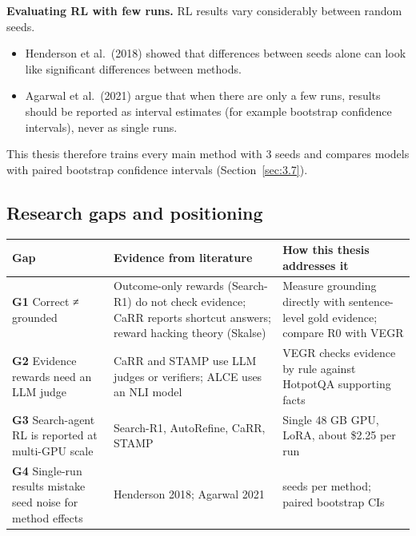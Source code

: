 \textbf{Evaluating RL with few runs.} RL results vary considerably
between random seeds.

\begin{itemize}
\tightlist
\item
  Henderson et al.~(2018) showed that differences between seeds alone
  can look like significant differences between methods.
\item
  Agarwal et al.~(2021) argue that when there are only a few runs,
  results should be reported as interval estimates (for example
  bootstrap confidence intervals), never as single runs.
\end{itemize}

This thesis therefore trains every main method with 3 seeds and compares
models with paired bootstrap confidence intervals
(Section~\ref{sec:3.7}).

\subsection{Research gaps and positioning}\label{sec:2.9}

{\def\LTcaptype{none} %
\begin{longtable}[]{@{}
  >{\raggedright\arraybackslash}p{}
  >{\raggedright\arraybackslash}p{}
  >{\raggedright\arraybackslash}p{}@{}}
\toprule\noalign{}
\begin{minipage}[b]{\linewidth}\raggedright
Gap
\end{minipage} & \begin{minipage}[b]{\linewidth}\raggedright
Evidence from literature
\end{minipage} & \begin{minipage}[b]{\linewidth}\raggedright
How this thesis addresses it
\end{minipage} \\
\midrule\noalign{}
\endhead
\bottomrule\noalign{}
\endlastfoot
\textbf{G1} Correct ≠ grounded & Outcome-only rewards (Search-R1) do not
check evidence; CaRR reports shortcut answers; reward hacking theory
(Skalse) & Measure grounding directly with sentence-level gold evidence;
compare R0 with VEGR \\
\textbf{G2} Evidence rewards need an LLM judge & CaRR and STAMP use LLM
judges or verifiers; ALCE uses an NLI model & VEGR checks evidence by
rule against HotpotQA supporting facts \\
\textbf{G3} Search-agent RL is reported at multi-GPU scale & Search-R1,
AutoRefine, CaRR, STAMP & Single 48 GB GPU, LoRA, about \$2.25 per
run \\
\textbf{G4} Single-run results mistake seed noise for method effects &
Henderson 2018; Agarwal 2021 & 3 seeds per method; paired bootstrap
CIs \\
\end{longtable}
}

